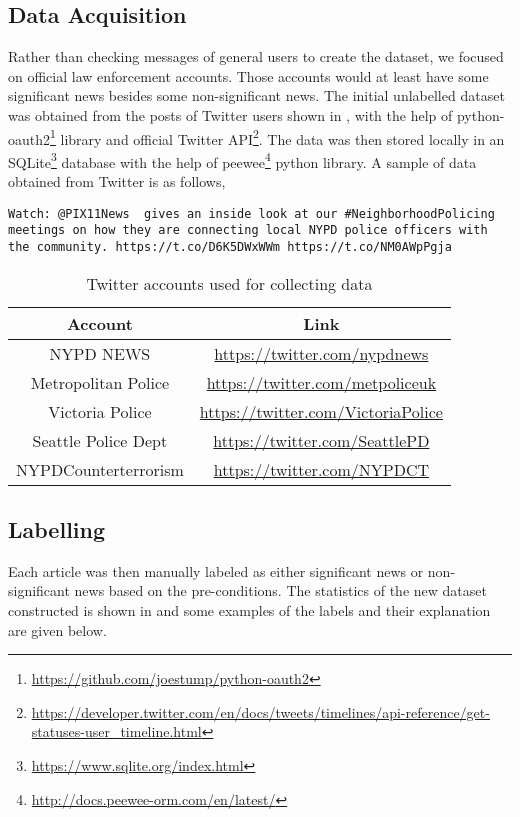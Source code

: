 \subsection{Data Acquisition}
Rather than checking messages of general users to create the dataset, we focused on official law enforcement accounts. Those accounts would at least have some significant news besides some non-significant news.
The initial unlabelled dataset was obtained from the posts of Twitter users shown in , with the help of python-oauth2\footnote{\url{https://github.com/joestump/python-oauth2}} library and official Twitter API\footnote{\url{https://developer.twitter.com/en/docs/tweets/timelines/api-reference/get-statuses-user_timeline.html}}. The data was then stored locally in an SQLite\footnote{\url{https://www.sqlite.org/index.html}} database with the help of peewee\footnote{\url{http://docs.peewee-orm.com/en/latest/}} python library. A sample of data obtained from Twitter is as follows,

\begin{verbatim}
Watch: @PIX11News  gives an inside look at our #NeighborhoodPolicing
meetings on how they are connecting local NYPD police officers with
the community. https://t.co/D6K5DWxWWm https://t.co/NM0AWpPgja
\end{verbatim}

\begin{table}
    \centering
    \caption{Twitter accounts used for collecting data}
    \label{tbl:twitter_users}
    \begin{tabular}{c|c}
    \toprule
    Account & Link \\
    \midrule
    NYPD NEWS & \url{https://twitter.com/nypdnews} \\
    Metropolitan Police & \url{https://twitter.com/metpoliceuk} \\
    Victoria Police & \url{https://twitter.com/VictoriaPolice} \\
    Seattle Police Dept & \url{https://twitter.com/SeattlePD} \\
    NYPDCounterterrorism & \url{https://twitter.com/NYPDCT} \\
    \bottomrule
    \end{tabular}
\end{table}



\subsection{Labelling}
Each article was then manually labeled as either significant news or non-significant news based on the pre-conditions. The statistics of the new dataset constructed is shown in   and some examples of the labels and their explanation are given below.

